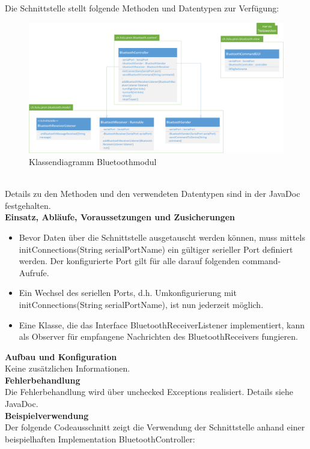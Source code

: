 Die Schnittstelle stellt folgende Methoden und Datentypen zur Verfügung:  \\
\begin{figure}[h!]          
	\centering             
	\includegraphics[width=1\textwidth]{../fig/Klassendiagramm Bluetoothmodul.png}
	\caption{Klassendiagramm Bluetoothmodul}
	\label{fig:Klassendiagramm Bluetoothmodul}        
\end{figure} \\
Details zu den Methoden und den verwendeten Datentypen sind in der JavaDoc festgehalten. \\
\textbf{Einsatz, Abläufe, Voraussetzungen und Zusicherungen}\\
\begin{itemize}
	\item{Bevor Daten über die Schnittstelle ausgetauscht werden können, muss mittels initConnections(String serialPortName) ein gültiger serieller Port definiert werden. Der konfigurierte Port gilt für alle darauf folgenden command-Aufrufe. }
	\item{Ein Wechsel des seriellen Ports, d.h. Umkonfigurierung mit initConnections(String serialPortName), ist nun jederzeit möglich.}
	\item{Eine Klasse, die das Interface BluetoothReceiverListener implementiert, kann als Observer für empfangene Nachrichten des BluetoothReceivers fungieren.}
\end{itemize}
\textbf{Aufbau und Konfiguration} \\
Keine zusätzlichen Informationen. \\
\textbf{Fehlerbehandlung}\\
Die Fehlerbehandlung wird über unchecked Exceptions realisiert. Details siehe JavaDoc. \\
\textbf{Beispielverwendung}\\
Der folgende Codeausschnitt zeigt die Verwendung der Schnittstelle anhand einer beispielhaften Implementation BluetoothController: \\
